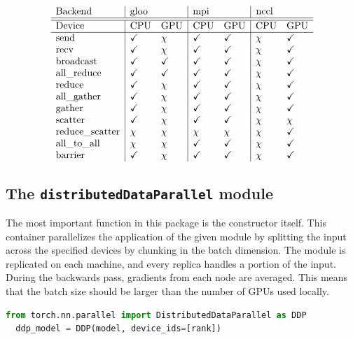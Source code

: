 \documentclass{article}
\begin{document}
\[\begin{array}{l|ll|ll|ll}
  \text{Backend} & \text{\lstinline{gloo}} & & \text{\lstinline{mpi}} & & \text{\lstinline{nccl}} \\
  \hline\hline
  \text{Device} & \text{CPU} & \text{GPU} & \text{CPU} & \text{GPU} & \text{CPU} & \text{GPU} \\
  \hline
  \text{send} & \checkmark & \chi & \checkmark & \checkmark & \chi & \checkmark \\
  \text{recv} & \checkmark & \chi & \checkmark & \checkmark & \chi & \checkmark \\
  \text{broadcast} & \checkmark & \checkmark & \checkmark & \checkmark & \chi & \checkmark \\
  \text{all\_reduce} & \checkmark & \checkmark & \checkmark & \checkmark & \chi & \checkmark \\
  \text{reduce} & \checkmark & \chi & \checkmark & \checkmark & \chi & \checkmark \\
  \text{all\_gather} & \checkmark & \chi & \checkmark & \checkmark & \chi & \checkmark \\
  \text{gather} & \checkmark & \chi & \checkmark & \checkmark & \chi & \checkmark \\
  \text{scatter} & \checkmark & \chi & \checkmark & \checkmark & \chi & \chi \\
  \text{reduce\_scatter} & \chi & \chi & \chi & \chi & \chi & \checkmark \\
  \text{all\_to\_all} & \chi & \chi & \checkmark & \checkmark & \chi & \checkmark \\
  \text{barrier} & \checkmark & \chi & \checkmark & \checkmark & \chi & \checkmark
\end{array}\]

\subsection{The \texorpdfstring{\lstinline{distributedDataParallel}}{distributedDataParallel} module}
The most important function in this package is the constructor itself. This container parallelizes the application of the given module by splitting the input across the specified devices by chunking in the batch dimension. The module is replicated on each machine, and every replica handles a portion of the input. During the backwards pass, gradients from each node are averaged. This means that the batch size should be larger than the number of GPUs used locally.

\begin{lstlisting}[language=Python]
  from torch.nn.parallel import DistributedDataParallel as DDP
  ddp_model = DDP(model, device_ids=[rank])
\end{lstlisting}
\end{document}
